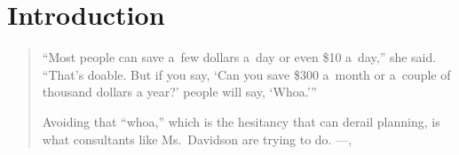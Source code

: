 


\renewcommand{\blindmarkup}[1]{\emph{#1}}
\blindmathfalse


\section{Introduction}
\label{sec:introduction}

\begin{quote}
	``Most people can save a~few dollars a~day or even \$10 a~day,'' she said. ``That’s doable. But if you say, `Can you save \$300 a~month or a~couple of thousand dollars a year?' people will say, `Whoa.'''

	Avoiding that ``whoa,'' which is the hesitancy that can derail planning, is what consultants like Ms.~Davidson are trying to do.
	\upshape
	\hspace{0pt}\hfill---\textit{},
\end{quote}

%
%
%
%
%

